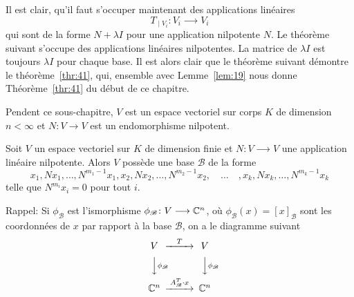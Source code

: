 \medskip 
\noindent 
Il est clair, qu'il faut s'occuper maintenant des applications linéaires 
\begin{displaymath}
  T_{∣V_i} \colon V_i ⟶ V_i 
\end{displaymath}
qui sont de la forme $N + λ I$ pour une application nilpotente $N$. Le théorème suivant s'occupe des applications linéaires nilpotentes. La matrice de $λI$ est toujours $λ I$ pour chaque base. Il est alors clair que le théorème suivant démontre le théorème~\ref{thr:41}, qui, ensemble avec Lemme~\ref{lem:19} nous donne Théorème~\ref{thr:41} du début de ce chapitre. 


\bigskip
\noindent
{\scriptsize  
Pendent ce sous-chapitre, $V$ est un espace vectoriel sur corps $K$ de dimension $n< ∞$ et $N: V → V$ est un endomorphisme nilpotent.
}
\begin{theorem}
  \label{thr:38}
  Soit $V$ un espace vectoriel sur $K$ de dimension finie et $N\colon V ⟶V$  une application linéaire nilpotente.  Alors $V$ possède une base $ℬ$ de la forme 
  \begin{displaymath}
    x_1,Nx_1, \dots, N^{m_1-1}x_1, x_2,Nx_2, \ldots , N^{m_2-1}x_2, \quad \dots \quad , x_k,Nx_k, \dots, N^{m_k-1}x_k
  \end{displaymath}
telle que $N^{m_i}x_i = 0$ pour tout $i$. 
\end{theorem}

{\scriptsize
  \noindent 
Rappel: Si  $\phi_{\mathscr{B}}$ est l'ismorphisme $\phi_{\mathscr{B}} \colon V \longrightarrow \mathbb{C}^n$, où $\phi_{\mathscr{B}}(x) = [x]_{\mathscr{B}}$ sont les coordonnées de $x$ par rapport à la base ${\mathscr{B}}$,  on a le diagramme suivant 
\begin{displaymath}
  {
  \begin{CD}
    V     @>T>>  V\\
    @VV \phi_{\mathscr{B}} V        @VV \phi_{\mathscr{B}} V\\ 
    \C^n     @>A^T_{\mathscr{B}} \cdot x>>  \C^n
  \end{CD}} 
\end{displaymath} 
}

